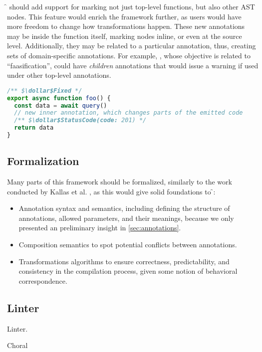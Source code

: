 \f{} should add support for marking not just top-level functions, but also other AST nodes.
This feature would enrich the framework further, as users would have more freedom
to change how transformations happen. These new annotations may be inside the function itself,
marking nodes inline, or even at the source level. Additionally, they may be related to a particular annotation,
thus, creating sets of domain-specific annotations.
For example, , whose objective is related to ``faasification'',
could have \textit{children} annotations that would issue a warning if used under other top-level annotations.
\begin{lstlisting}[language=javascript]
/** $\dollar$Fixed */
export async function foo() {
  const data = await query()
  // new inner annotation, which changes parts of the emitted code
  /** $\dollar$StatusCode(code: 201) */
  return data
}
\end{lstlisting}

\subsection{Formalization}

Many parts of this framework should be formalized, similarly to the work conducted by Kallas et al. \cite{formalization},
as this would give solid foundations to \f{}:

\begin{itemize}
  \item Annotation syntax and semantics, including defining
    the structure of annotations, allowed parameters, and their meanings,
    because we only presented an preliminary insight in \cref{sec:annotations}.

  \item Composition semantics to spot potential conflicts between annotations.

  \item Transformations algorithms to ensure correctness, predictability,
    and consistency in the compilation process, given some notion of behavioral correspondence.
\end{itemize}

\subsection{Linter}

Linter.

Choral
